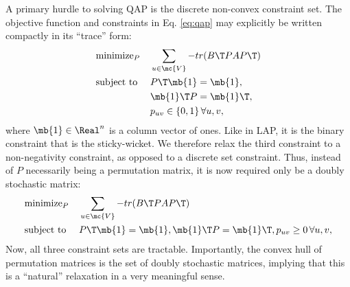 \documentclass[10pt,journal,cspaper,compsoc]{IEEEtran}
\begin{document}
A primary hurdle to solving QAP is the discrete non-convex constraint set.  The objective function and constraints in Eq. \eqref{eq:qap} may explicitly be written compactly in its ``trace'' form:
\begin{align}
		&\text{minimize}_P  &&\sum_{u \in \mc{V}} - tr(B\T PAP\T) \nonumber \\
		&\text{subject to } &&P\T\mb{1}=\mb{1}, \nonumber \\
		& && \mb{1}\T P=\mb{1}\T, \nonumber \\
		& &&p_{uv} \in \{0,1\} \, \forall u,v, \label{eq:QAP}	
\end{align}
where $\mb{1} \in \Real^n$ is a column vector of ones.  
Like in LAP, it is the binary constraint that is the sticky-wicket. We therefore relax the third constraint to a non-negativity constraint, as opposed to a discrete set constraint.  Thus, instead of $P$ necessarily being a permutation matrix, it is now required only be a doubly stochastic matrix:
\begin{align}
		&\text{minimize}_P  &&\sum_{u \in \mc{V}} - tr(B\T PAP\T) \nonumber \\
		&\text{subject to } &&P\T\mb{1}=\mb{1}, %
		\mb{1}\T P=\mb{1}\T, %
		p_{uv} \geq 0 \, \forall u,v, \label{eq:AQAP}	
\end{align}
Now, all three constraint sets are tractable.  Importantly, the convex hull of permutation matrices is the set of doubly stochastic matrices, implying that this is a ``natural'' relaxation in a very meaningful sense.    

\end{document}

